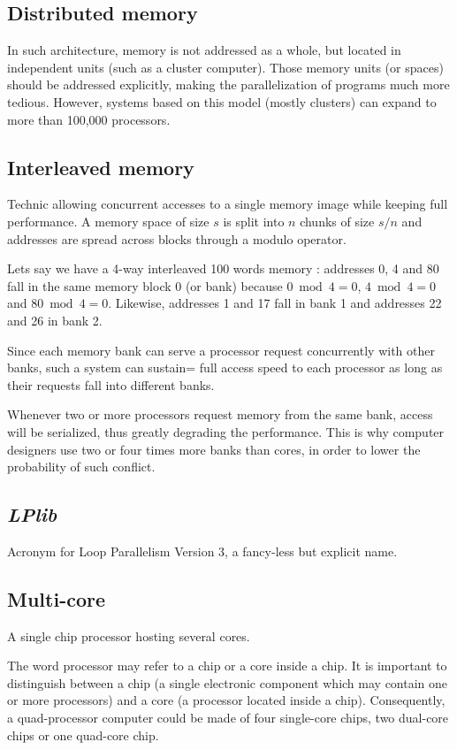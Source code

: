 \documentclass[a4paper,12pt]{article}
\begin{document}
\subsection{Distributed memory}
In such architecture, memory is not addressed as a whole, but located in independent units (such as a cluster computer). Those memory units (or spaces) should be addressed explicitly, making the parallelization of programs much more tedious. However, systems based on this model (mostly clusters) can expand to more than 100,000 processors.

\subsection{Interleaved memory}
Technic allowing concurrent accesses to a single memory image while keeping full performance. A memory space of size $s$ is split into $n$ chunks of size $s/n$ and addresses are spread across blocks through a modulo operator.

Lets say we have a 4-way interleaved 100 words memory :
addresses 0, 4 and 80 fall in the same memory block 0 (or bank) because $0 \bmod 4 = 0$, $4 \bmod 4 = 0$ and $80 \bmod 4 = 0$. Likewise, addresses 1 and 17 fall in bank 1 and addresses 22 and 26 in bank 2.

Since each memory bank can serve a processor request concurrently with other banks, such a system can sustain= full access speed to each processor as long as their requests fall into different banks.

Whenever two or more processors request memory from the same bank, access will be serialized, thus greatly degrading the performance. This is why computer designers use two or four times more banks than cores, in order to lower the probability of such conflict.

\subsection{\emph{LPlib}}
Acronym for Loop Parallelism Version 3, a fancy-less but explicit name.

\subsection{Multi-core}
A single chip processor hosting several cores.

The word processor may refer to a chip or a core inside a chip. It is important to distinguish between a chip (a single electronic component which may contain one or more processors) and a core (a processor located inside a chip). Consequently, a quad-processor computer could be made of four single-core chips, two dual-core chips or one quad-core chip.
\end{document}
